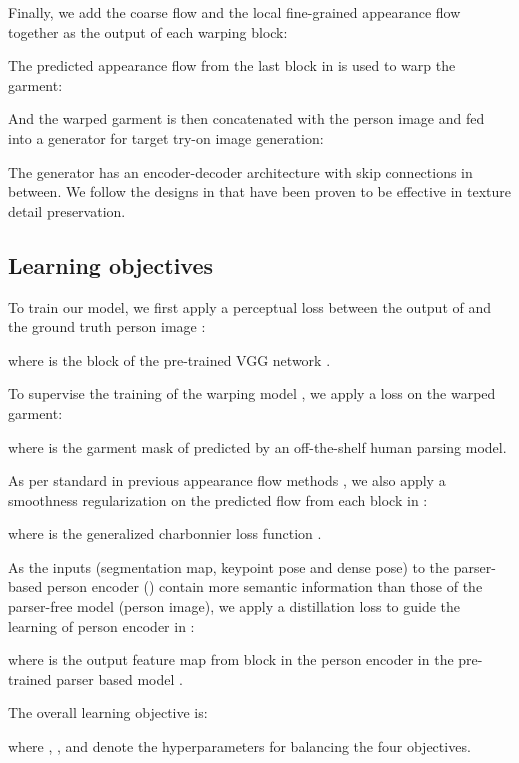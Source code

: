 \documentclass[10pt,twocolumn,letterpaper]{article}
\begin{document}
Finally, we add the coarse flow and the local fine-grained appearance flow together as the output of each warping block:



The predicted appearance flow  from the last block in  is used to warp the garment:


And the warped garment  is then concatenated with the person image and fed into a generator for target try-on image generation:

The generator  has an encoder-decoder architecture with skip connections in between. We follow the designs in \cite{isola2017image,zhu2017unpaired} that have been proven to be effective in texture detail preservation.

\subsection{Learning objectives}

To train our model, we first apply a perceptual loss \cite{johnson2016perceptual} between the output of  and the ground truth person image :


where  is the  block of the pre-trained VGG network \cite{simonyan2014very}.

To supervise the training of the warping model , we apply a loss on the warped garment:

where  is the garment mask of  predicted by an off-the-shelf human parsing model.

As per standard in previous appearance flow methods \cite{ge2021parser,han2019clothflow}, we also apply a smoothness regularization on the predicted flow from each block in :

where  is the generalized charbonnier loss function \cite{sun2014quantitative}.

As the inputs (segmentation map, keypoint pose and dense pose) to the parser-based person encoder () contain more semantic information than those of the parser-free model  (person image), we apply a distillation loss to guide the learning of person encoder  in :

where  is the output feature map from  block in the person encoder  in the pre-trained parser based model .

The overall learning objective is:


where ,  , and  denote the hyperparameters for balancing the four objectives.
\end{document}
